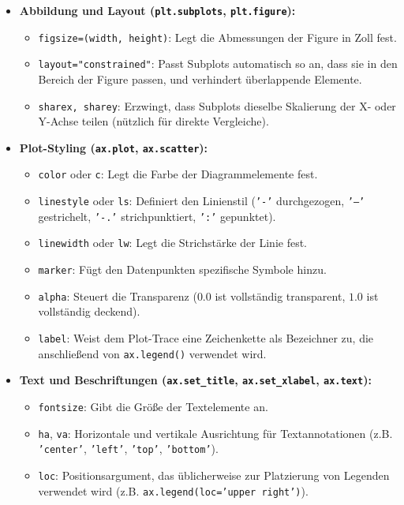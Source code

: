 \begin{itemize}
    \item \textbf{Abbildung und Layout (\texttt{plt.subplots}, \texttt{plt.figure}):}
    \begin{itemize}
        \item \texttt{figsize=(width, height)}: Legt die Abmessungen der Figure in Zoll fest.
        \item \texttt{layout="constrained"}: Passt Subplots automatisch so an, dass sie in den Bereich der Figure passen, und verhindert überlappende Elemente.
        \item \texttt{sharex, sharey}: Erzwingt, dass Subplots dieselbe Skalierung der X- oder Y-Achse teilen (nützlich für direkte Vergleiche).
    \end{itemize}
    
    \item \textbf{Plot-Styling (\texttt{ax.plot}, \texttt{ax.scatter}):}
    \begin{itemize}
        \item \texttt{color} oder \texttt{c}: Legt die Farbe der Diagrammelemente fest.
        \item \texttt{linestyle} oder \texttt{ls}: Definiert den Linienstil (\texttt{'-'} durchgezogen, \texttt{'---'} gestrichelt, \texttt{'-.'} strichpunktiert, \texttt{':'} gepunktet).
        \item \texttt{linewidth} oder \texttt{lw}: Legt die Strichstärke der Linie fest.
        \item \texttt{marker}: Fügt den Datenpunkten spezifische Symbole hinzu.
        \item \texttt{alpha}: Steuert die Transparenz ($0.0$ ist vollständig transparent, $1.0$ ist vollständig deckend).
        \item \texttt{label}: Weist dem Plot-Trace eine Zeichenkette als Bezeichner zu, die anschließend von \texttt{ax.legend()} verwendet wird.
    \end{itemize}
    
    \item \textbf{Text und Beschriftungen (\texttt{ax.set\_title}, \texttt{ax.set\_xlabel}, \texttt{ax.text}):}
    \begin{itemize}
        \item \texttt{fontsize}: Gibt die Größe der Textelemente an.
        \item \texttt{ha}, \texttt{va}: Horizontale und vertikale Ausrichtung für Textannotationen (z.B. \texttt{'center'}, \texttt{'left'}, \texttt{'top'}, \texttt{'bottom'}).
        \item \texttt{loc}: Positionsargument, das üblicherweise zur Platzierung von Legenden verwendet wird (z.B. \texttt{ax.legend(loc='upper right')}).
    \end{itemize}
\end{itemize}

